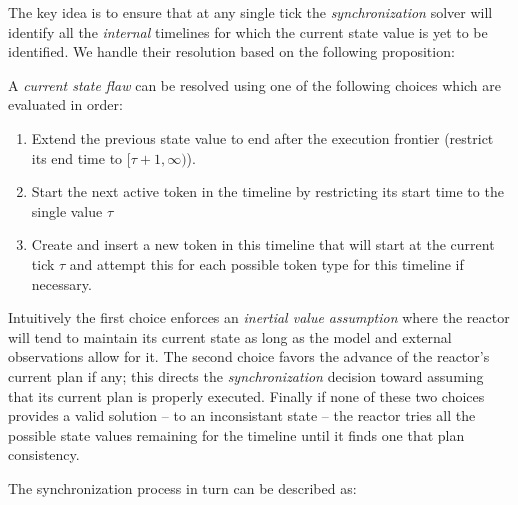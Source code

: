 The key idea is to ensure that at any single tick the {\em
  synchronization} solver will identify all the {\em internal}
timelines for which the current state value is yet to be
identified. We handle their resolution based on the following
proposition:

\begin{proposition}
  \label{prop:csf:resolve}
  A {\em current state flaw} can be resolved using one of the
  following choices which are evaluated in order:

  \begin{enumerate}

  \item Extend the previous state value to end after the execution
    frontier (\ie restrict its end time to $[\tau+1, \infty)$).

  \item Start the next active token in the timeline by restricting its
    start time to the single value $\tau$

  \item Create and insert a new token in this timeline that will start
    at the current tick $\tau$ and attempt this for each possible
    token type for this timeline if necessary.

\end{enumerate}
\end{proposition}

Intuitively the first choice enforces an \emph{inertial value
  assumption} where the reactor will tend to maintain its current
state as long as the model and external observations allow for it. The
second choice favors the advance of the reactor's current plan if any;
this directs the {\em synchronization} decision toward assuming that
its current plan is properly executed. Finally if none of these two
choices provides a valid solution -- \ie {} to an
inconsistant state -- the reactor tries all the possible state values
remaining for the timeline until it finds one that  plan consistency.

The synchronization process in turn can be described as:

